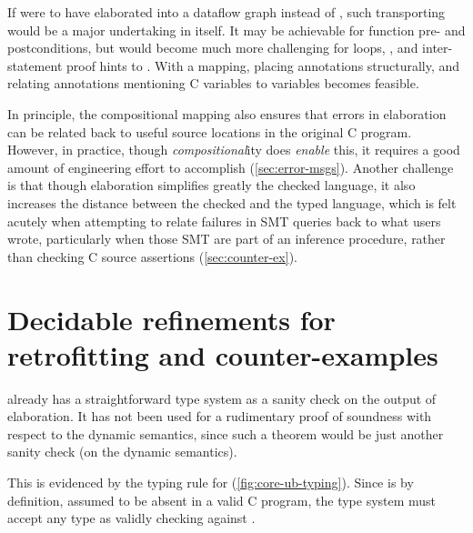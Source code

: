 If  were to have elaborated into a dataflow graph instead of ,
such transporting would be a major undertaking in itself. It may be achievable
for function pre- and postconditions, but would become much more challenging
for loops, , and inter-statement proof
hints to . With a  mapping, placing annotations
structurally, and relating annotations mentioning C variables to 
variables becomes feasible.

In principle, the compositional mapping also ensures that errors in 
elaboration can be related back to useful source locations in the original C
program. However, in practice, though \emph{compositional}ity does
\emph{enable} this, it requires a good amount of engineering effort to
accomplish (\cref{sec:error-msgs}). Another challenge is that though
elaboration simplifies greatly the checked language, it also increases the
distance between the checked and the typed language, which is felt acutely when
attempting to relate failures in SMT queries back to what users wrote,
particularly when those SMT are part of an inference procedure, rather
than checking C source assertions (\cref{sec:counter-ex}).

\section{Decidable refinements for retrofitting and counter-examples}

 already has a straightforward  type system as a
sanity check on the output of elaboration. It has not been used for a
rudimentary proof of soundness with respect to the dynamic semantics, since
such a theorem would be just another sanity check (on the dynamic semantics).

\begin{marginfigure}
    \centering
    \begin{mathpar}
    \end{mathpar}
    \caption{Checking rule for the  pure expression as %
        mentioned in \textcite{memarian2022cerberus}.}\label{fig:core-ub-typing}
\end{marginfigure}

This is evidenced by the typing rule for  %
(\cref{fig:core-ub-typing}). Since  is by definition, assumed to be
absent in a valid C program, the type system must accept any type as validly
checking against . %

